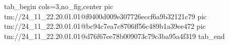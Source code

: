  
 
 
 
 

\qqSecOrig


\ifcmt
  tab_begin cols=3,no_fig,center
    pic tm://24_11_22.20.01.01@f0400d009e307726eccf6a9b32121c79
    pic tm://24_11_22.20.01.01@bc94c7ea7c8706ff56c489b1a39ee472
    pic tm://24_11_22.20.01.01@d76f67ee78b009073c79c3ba95a4f319
  tab_end
\fi

